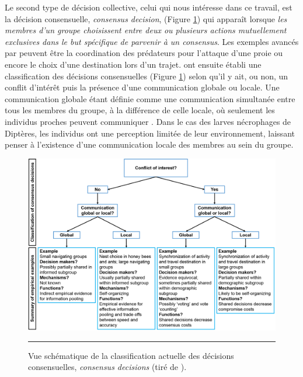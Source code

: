 Le second type de décision collective, celui qui nous intéresse dans ce travail, est la décision consensuelle, \textit{consensus decision}, (Figure \ref{fig:consensus}) qui apparaît lorsque \textit{les membres d'un groupe choisissent entre deux ou plusieurs actions mutuellement exclusives dans le but spécifique de parvenir à un consensus}\footnotemark[4] \cite{conradt_consensus_2005}. Les exemples avancés par \citet{conradt_consensus_2005} peuvent être la coordination des prédateurs pour l'attaque d'une proie ou encore le choix d'une destination lors d'un trajet. \citet{conradt_consensus_2005} ont ensuite établi une classification des décisions consensuelles (Figure \ref{fig:consensus}) selon qu'il y ait, ou non, un conflit d'intérêt puis la présence d'une communication globale ou locale. Une communication globale étant définie comme une communication simultanée entre tous les membres du groupe, à la différence de celle locale, où seulement les individus proches peuvent communiquer \cite{conradt_consensus_2005}. Dans le cas des larves nécrophages de Diptères, les individus ont une perception limitée de leur environnement, laissant penser à l'existence d'une communication locale des membres au sein du groupe.

 


    
 \begin{figure}[ht]
	\centering
		\includegraphics[width=0.8 \textwidth]{Figures/consensusdecision.png}
		\rule{35em}{0.5pt}
	\caption[Consensus]{Vue schématique de la classification actuelle des décisions consensuelles, \textit{consensus decisions} (tiré de \citet{conradt_consensus_2005}).}
	\label{fig:consensus}   
 \end{figure}       

